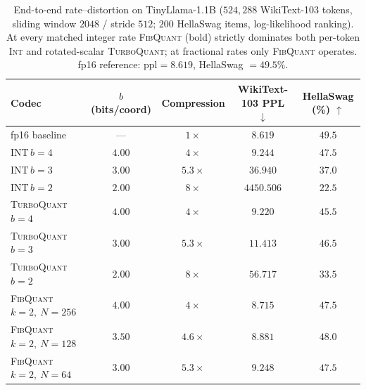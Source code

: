 \documentclass{article}
\theoremstyle{definition}
\theoremstyle{remark}
\begin{document}
\begin{table}[h]
\caption{End-to-end rate--distortion on TinyLlama-1.1B
($524{,}288$ WikiText-103 tokens, sliding window $2048$ / stride
$512$; $200$ HellaSwag items, log-likelihood ranking).  At every
matched integer rate \textsc{FibQuant} (bold) strictly dominates
both per-token \textsc{Int} and rotated-scalar \textsc{TurboQuant};
at fractional rates only \textsc{FibQuant} operates.  fp16
reference: $\mathrm{ppl} = 8.619$, HellaSwag $= 49.5\%$.}
\label{tab:llm_rd}
\begin{center}\small
\begin{tabular}{l c c c c}
\toprule
Codec & $b$ (bits/coord) & Compression & WikiText-103 PPL $\downarrow$ & HellaSwag (\%) $\uparrow$ \\
\midrule
fp16 baseline                       & ---  & $1\times$  & $\mathbf{8.619}$ & $\mathbf{49.5}$ \\
\midrule
\textsc{INT}\,$b{=}4$                & $4.00$ & $4\times$  & $9.244$    & $47.5$ \\
\textsc{INT}\,$b{=}3$                & $3.00$ & $5.3\times$& $36.940$   & $37.0$ \\
\textsc{INT}\,$b{=}2$                & $2.00$ & $8\times$  & $4450.506$ & $22.5$ \\
\midrule
\textsc{TurboQuant}\,$b{=}4$         & $4.00$ & $4\times$  & $9.220$    & $45.5$ \\
\textsc{TurboQuant}\,$b{=}3$         & $3.00$ & $5.3\times$& $11.413$   & $46.5$ \\
\textsc{TurboQuant}\,$b{=}2$         & $2.00$ & $8\times$  & $56.717$   & $33.5$ \\
\midrule
\textsc{FibQuant} $k{=}2,\ N{=}256$  & $4.00$ & $4\times$  & $\mathbf{8.715}$  & $\mathbf{47.5}$ \\
\textsc{FibQuant} $k{=}2,\ N{=}128$  & $3.50$ & $4.6\times$& $\mathbf{8.881}$  & $\mathbf{48.0}$ \\
\textsc{FibQuant} $k{=}2,\ N{=}64$   & $3.00$ & $5.3\times$& $\mathbf{9.248}$  & $\mathbf{47.5}$ \\

\end{tabular}
\end{center}
\end{table}
\end{document}
